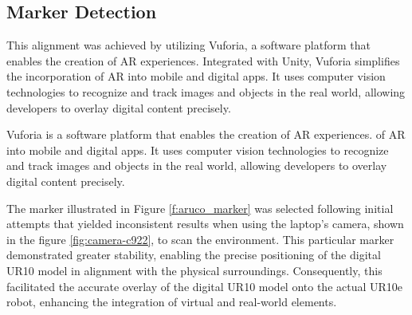\subsection{Marker Detection}
\label{section:marker-detection}

This alignment was achieved by utilizing Vuforia, a software platform that enables the creation of \ac{AR} experiences. Integrated with Unity, Vuforia simplifies the incorporation of AR into mobile and digital apps. It uses computer vision technologies to recognize and track images and objects in the real world, allowing developers to overlay digital content precisely.

    Vuforia is a software platform that enables the creation of \ac{AR} experiences. 
    of AR into mobile and digital apps. 
    It uses computer vision technologies to recognize and track images and objects in the real world, allowing developers to overlay digital 
    content precisely.

    The marker illustrated in Figure \ref{f:aruco_marker} was selected following initial attempts that yielded inconsistent results when using 
    the laptop's camera, shown in the figure \ref{fig:camera-c922}, to scan the environment. This particular marker demonstrated greater stability, 
    enabling the precise positioning of the digital UR10 model in alignment with the physical surroundings. Consequently, this facilitated the accurate 
    overlay of the digital UR10 model onto the actual UR10e robot, enhancing the integration of virtual and real-world elements.

